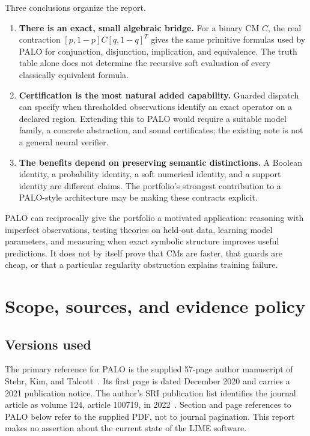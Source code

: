 \documentclass[11pt,a4paper]{article}
\theoremstyle{remark}
\begin{document}
Three conclusions organize the report.
\begin{enumerate}
\item \textbf{There is an exact, small algebraic bridge.} For a binary CM $C$, the real contraction $[p,1-p]C[q,1-q]^T$ gives the same primitive formulas used by PALO for conjunction, disjunction, implication, and equivalence. The truth table alone does not determine the recursive soft evaluation of every classically equivalent formula.
\item \textbf{Certification is the most natural added capability.} Guarded dispatch can specify when thresholded observations identify an exact operator on a declared region. Extending this to PALO would require a suitable model family, a concrete abstraction, and sound certificates; the existing note is not a general neural verifier.
\item \textbf{The benefits depend on preserving semantic distinctions.} A Boolean identity, a probability identity, a soft numerical identity, and a support identity are different claims. The portfolio's strongest contribution to a PALO-style architecture may be making these contracts explicit.
\end{enumerate}

PALO can reciprocally give the portfolio a motivated application: reasoning with imperfect observations, testing theories on held-out data, learning model parameters, and measuring when exact symbolic structure improves useful predictions. It does not by itself prove that CMs are faster, that guards are cheap, or that a particular regularity obstruction explains training failure.

\section{Scope, sources, and evidence policy}
\subsection{Versions used}
The primary reference for PALO is the supplied 57-page author manuscript of Stehr, Kim, and Talcott~\cite{palo}. Its first page is dated December 2020 and carries a 2021 publication notice. The author's SRI publication list identifies the journal article as volume 124, article 100719, in 2022~\cite{sri}. Section and page references to PALO below refer to the supplied PDF, not to journal pagination. This report makes no assertion about the current state of the LIME software.
\end{document}
